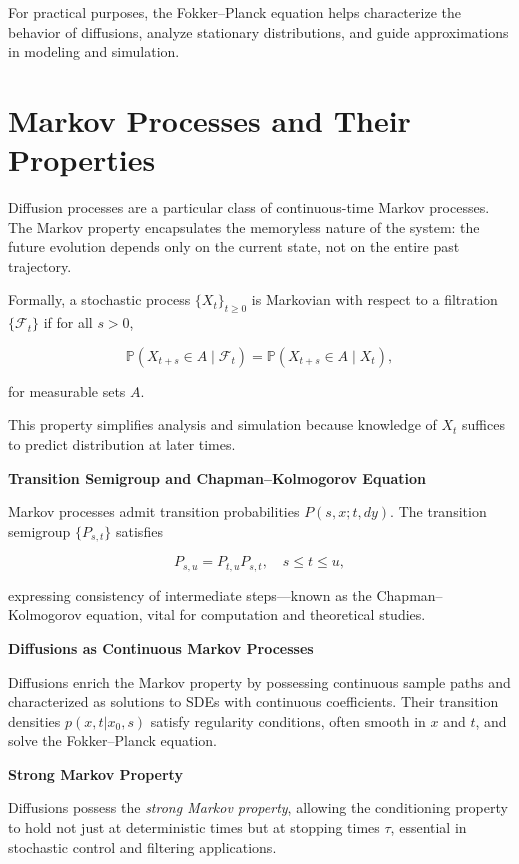 For practical purposes, the Fokker--Planck equation helps characterize the behavior of diffusions, analyze stationary distributions, and guide approximations in modeling and simulation.

\section{Markov Processes and Their Properties}

Diffusion processes are a particular class of continuous-time Markov processes. The Markov property encapsulates the memoryless nature of the system: the future evolution depends only on the current state, not on the entire past trajectory.

Formally, a stochastic process \( \{X_t\}_{t \geq 0} \) is Markovian with respect to a filtration \( \{\mathcal{F}_t\} \) if for all \( s > 0 \),

\[
\mathbb{P}(X_{t+s} \in A \mid \mathcal{F}_t) = \mathbb{P}(X_{t+s} \in A \mid X_t),
\]

for measurable sets \( A \).

This property simplifies analysis and simulation because knowledge of \( X_t \) suffices to predict distribution at later times.

\textbf{Transition Semigroup and Chapman--Kolmogorov Equation}

Markov processes admit transition probabilities \( P(s,x;t,dy) \). The transition semigroup \( \{P_{s,t}\} \) satisfies

\[
P_{s,u} = P_{t,u} P_{s,t}, \quad s \leq t \leq u,
\]

expressing consistency of intermediate steps—known as the Chapman--Kolmogorov equation, vital for computation and theoretical studies.

\textbf{Diffusions as Continuous Markov Processes}

Diffusions enrich the Markov property by possessing continuous sample paths and characterized as solutions to SDEs with continuous coefficients. Their transition densities \( p(x,t | x_0, s) \) satisfy regularity conditions, often smooth in \( x \) and \( t \), and solve the Fokker--Planck equation.

\textbf{Strong Markov Property}

Diffusions possess the \emph{strong Markov property}, allowing the conditioning property to hold not just at deterministic times but at stopping times \( \tau \), essential in stochastic control and filtering applications.

